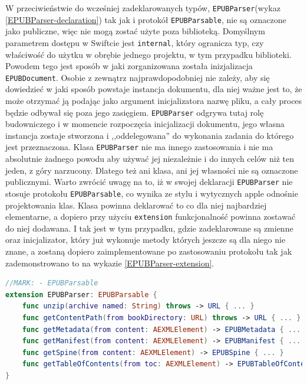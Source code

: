 W przeciwieństwie do wcześniej zadeklarowanych typów, \texttt{EPUBParser}(wykaz \ref{EPUBParser-declaration}) tak jak i protokół \texttt{EPUBParsable}, nie są oznaczone jako publiczne, więc nie mogą zostać użyte poza biblioteką. Domyślnym parametrem dostępu w Swiftcie jest \texttt{internal}, który ogranicza typ, czy właściwość do użytku w obrębie jednego projektu, w tym przypadku biblioteki. Powodem tego jest sposób w jaki zorganizowana została inizjalizacja \texttt{EPUBDocument}. Osobie z zewnątrz najprawdopodobniej nie zależy, aby się dowiedzieć w jaki sposób powstaje instancja dokumentu, dla niej ważne jest to, że może otrzymać ją podając jako argument inicjalizatora nazwę pliku, a cały proces będzie odbywał się poza jego zasięgiem. \texttt{EPUBParser} odgrywa tutaj rolę budowniczego i w momencie rozpoczęcia inicjalizacji dokumentu, jego własna instancja zostaje stworzona i ,,oddelegowana'' do wykonania zadania do którego jest przeznaczona. Klasa \texttt{EPUBParser} nie ma innego zastosowania  i nie ma absolutnie żadnego powodu aby używać jej niezależnie i do innych celów niż ten jeden, z góry narzucony. Dlatego też ani klasa, ani jej własności nie są oznaczone publicznymi. Warto zwrócić uwagę na to, iż w swojej deklaracji \texttt{EPUBParser} nie stosuje protokołu \texttt{EPUBParsable}, co wynika ze stylu i wytycznych apple odnośnie projektowania klas. Klasa powinna deklarować to co dla niej najbardziej elementarne, a dopiero przy użyciu \texttt{extension} funkcjonalność powinna zostawać do niej dodawana. I tak jest w tym przypadku, gdzie zadeklarowane są zmienne oraz inicjalizator, który już wykonuje metody których jeszcze są dla niego nie znane, a zostaną dopiero zaimplementowane po zastosowaniu protokołu tak jak zademonstrowano to na wykazie \ref{EPUBParser-extension}.

\begin{lstlisting}[firstnumber=30,caption={Klasa EPUBParser stosuje protokół EPUBParsable}, language=swift,label=EPUBParser-extension]
//MARK: - EPUBParsable
extension EPUBParser: EPUBParsable {
    func unzip(archive named: String) throws -> URL { ... }
    func getContentPath(from bookDirectory: URL) throws -> URL { ... }
    func getMetadata(from content: AEXMLElement) -> EPUBMetadata { ... }
    func getManifest(from content: AEXMLElement) -> EPUBManifest { ... }
    func getSpine(from content: AEXMLElement) -> EPUBSpine { ... }
    func getTableOfContents(from toc: AEXMLElement) -> EPUBTableOfContents { ... }
}
\end{lstlisting}

